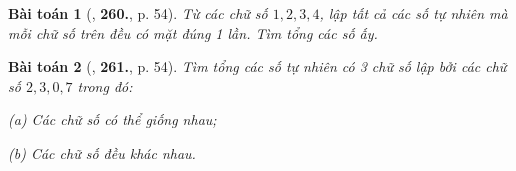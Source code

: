 \documentclass{article}
\numberwithin{equation}{section}
\newtheorem{baitoan}{Bài toán}
\begin{document}
\begin{baitoan}[\cite{Binh_Toan_6_tap_1}, \textbf{260.}, p. 54]
	Từ các chữ số $1,2,3,4$, lập tất cả các số tự nhiên mà mỗi chữ số trên đều có mặt đúng 1 lần. Tìm tổng các số ấy.
\end{baitoan}

\begin{baitoan}[\cite{Binh_Toan_6_tap_1}, \textbf{261.}, p. 54]
	Tìm tổng các số tự nhiên có 3 chữ số lập bởi các chữ số $2,3,0,7$ trong đó:
	\begin{enumerate*}
		\item[(a)] Các chữ số có thể giống nhau;
		\item[(b)] Các chữ số đều khác nhau.
	\end{enumerate*}
\end{baitoan}


\printbibliography[heading=bibintoc]
	
\end{document}
